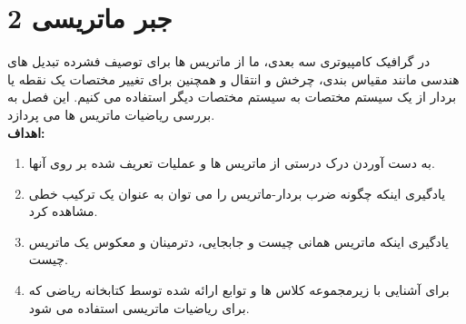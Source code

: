 

\newpage

\setcounter{chapter}{2}
\setcounter{example}{0}
\setcounter{section}{0}

\textbf{\vspace{80pt}}


\chapter{\textbf{2 جبر ماتریسی}}
\textbf{\vspace{70pt}}
{
    \Large
    \begin{spacing}{1.5}
        در گرافیک کامپیوتری سه بعدی، ما از ماتریس ها برای توصیف فشرده تبدیل های هندسی مانند مقیاس بندی، چرخش و انتقال و همچنین برای تغییر مختصات یک نقطه یا بردار از یک سیستم مختصات به سیستم مختصات دیگر استفاده می کنیم.
        این فصل به بررسی ریاضیات ماتریس ها می پردازد.
        \\

        \textbf{\LARGE \hspace{-40pt}اهداف:}
        \begin{enumerate}[label=\textbf{\arabic*}.]
            \item {به دست آوردن درک درستی از ماتریس ها و عملیات تعریف شده بر روی آنها.}
            \item {یادگیری اینکه چگونه ضرب بردار-ماتریس را می توان به عنوان یک ترکیب خطی مشاهده کرد.}
            \item {یادگیری اینکه ماتریس همانی چیست و جابجایی، دترمینان و معکوس یک ماتریس چیست.}
            \item {برای آشنایی با زیرمجموعه کلاس ها و توابع ارائه شده توسط کتابخانه ریاضی  که برای ریاضیات ماتریسی استفاده می شود.}
        \end{enumerate}
    \end{spacing}
}
\newpage

\setcounter{figure}{0}
\renewcommand{\thefigure}{\arabic{figure}.\arabic{chapter}}


